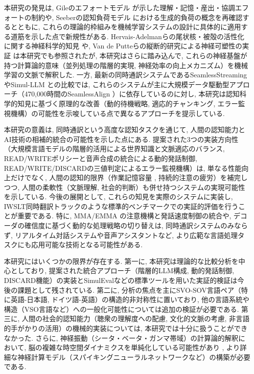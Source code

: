 本研究の発見は, Gileのエフォートモデル \cite{gile1995basic} が示した理解・記憶・産出・協調エフォートの制約や, Seeberの認知負荷モデル \cite{seeber2011cognitive} における生成的負荷の概念を再確認するとともに, これらの理論的枠組みを機械学習システムの設計に具体的に適用する道筋を示した点で新規性がある.
Hervais-Adelmanらの尾状核・被殻の活性化に関する神経科学的知見 \cite{hervais2015fmri} や, Van de Putteらの縦断的研究による神経可塑性の実証 \cite{vandeputte2018anatomical} は本研究でも参照されたが, 本研究はさらに踏み込んで, これらの神経基盤が持つ計算論的意味（並列処理の階層的実現, 神経効率の向上メカニズム）を機械学習の文脈で解釈した.
一方, 最新の同時通訳システムであるSeamlessStreamingやSimul-LLM \cite{agostinelli2024simulllm} との比較では, これらのシステムが主に大規模データ駆動型アプローチ（470,000時間のSeamlessAlign \cite{barrault2023seamlessm4t}）に依存しているのに対し, 本研究は認知科学的知見に基づく原理的な改善（動的待機戦略, 適応的チャンキング, エラー監視機構）の可能性を示唆している点で異なるアプローチを提示している.

本研究の意義は, 同時通訳という高度な認知タスクを通じて, 人間の認知能力とAI技術の相補的統合の可能性を示した点にある.
提案された3つの実装方向性（大規模言語モデルの階層的活用による世界知識と文脈適応のバランス, READ/WRITEポリシーと音声合成の統合による動的発話制御, READ/WRITE/DISCARDの三値判定によるエラー監視機構）は, 単なる性能向上だけでなく, 人間の認知的限界（作業記憶容量 \cite{baddeley2000episodic}, 持続的注意の疲労）を補完しつつ, 人間の柔軟性（文脈理解, 社会的判断）も併せ持つシステムの実現可能性を示している.
今後の展開として, これらの知見を実際のシステムに実装し, IWSLT同時翻訳トラックのような標準的ベンチマークでの実証的評価を行うことが重要である.
特に, MMA/EMMA \cite{ma2020monotonic,ma2023efficient} の注意機構と発話速度制御の統合や, デコーダの確信度に基づく動的な処理戦略の切り替えは, 同時通訳システムのみならず, リアルタイム対話システムや音声アシスタントなど, より広範な言語処理タスクにも応用可能な技術となる可能性がある.

本研究にはいくつかの限界が存在する.
第一に, 本研究は理論的な比較分析を中心としており, 提案された統合アプローチ（階層的LLM構成, 動的発話制御, DISCARD機能）の実装とSimulEvalなどの標準ツールを用いた実証的検証は今後の課題として残されている.
第二に, 分析の焦点を主にSVO-SOV言語ペア（特に英語-日本語, ドイツ語-英語）の構造的非対称性に置いており, 他の言語系統や構造（VSO言語など）への一般化可能性については追加の検証が必要である.
第三に, 人間の社会的認知能力（聴衆の理解度への配慮, 文化的文脈の考慮, 非言語的手がかりの活用）の機械的実装については, 本研究では十分に扱うことができなかった.
さらに, 神経振動（シータ・ベータ・ガンマ帯域）の計算論的解釈において, 脳の複雑な時空間ダイナミクスを単純化している可能性があり \cite{yagura2021selective}, より詳細な神経計算モデル（スパイキングニューラルネットワークなど）の構築が必要である.

